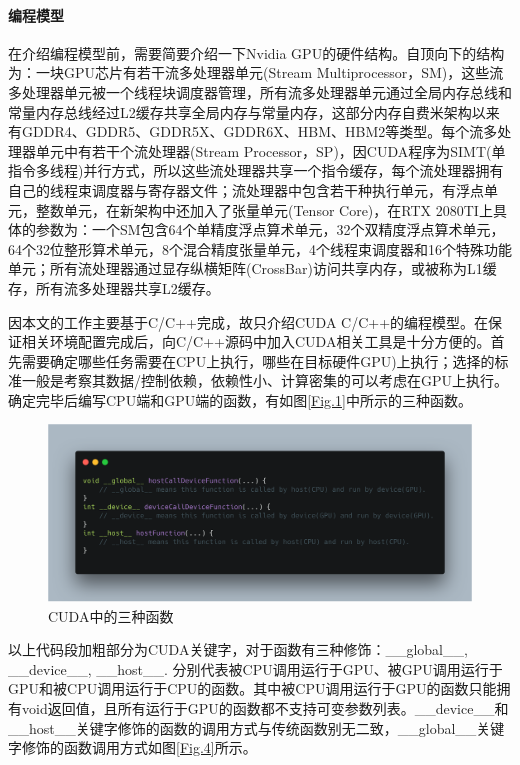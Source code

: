 \paragraph{编程模型}
\par 在介绍编程模型前，需要简要介绍一下Nvidia GPU的硬件结构。自顶向下的结构为：一块GPU芯片有若干流多处理器单元(Stream Multiprocessor，SM)，这些流多处理器单元被一个线程块调度器管理，所有流多处理器单元通过全局内存总线和常量内存总线经过L2缓存共享全局内存与常量内存，这部分内存自费米架构以来有GDDR4、GDDR5、GDDR5X、GDDR6X、HBM、HBM2等类型。每个流多处理器单元中有若干个流处理器(Stream Processor，SP)，因CUDA程序为SIMT(单指令多线程)并行方式，所以这些流处理器共享一个指令缓存，每个流处理器拥有自己的线程束调度器与寄存器文件；流处理器中包含若干种执行单元，有浮点单元，整数单元，在新架构中还加入了张量单元(Tensor Core)，在RTX 2080TI上具体的参数为：一个SM包含64个单精度浮点算术单元，32个双精度浮点算术单元，64个32位整形算术单元，8个混合精度张量单元，4个线程束调度器和16个特殊功能单元；所有流处理器通过显存纵横矩阵(CrossBar)访问共享内存，或被称为L1缓存\parencite{EXPLORING}，所有流多处理器共享L2缓存。
\par 因本文的工作主要基于C/C++完成，故只介绍CUDA C/C++的编程模型。在保证相关环境配置完成后，向C/C++源码中加入CUDA相关工具是十分方便的。首先需要确定哪些任务需要在CPU上执行，哪些在目标硬件GPU)上执行；选择的标准一般是考察其数据/控制依赖，依赖性小、计算密集的可以考虑在GPU上执行。确定完毕后编写CPU端和GPU端的函数，有如图\ref{Fig.1}中所示的三种函数。
\begin{figure}
	\centering
	\includegraphics[width=15cm]{figures/CODE1.png}
	\caption{\label{Fig.2} CUDA中的三种函数}
\end{figure}
\par 以上代码段加粗部分为CUDA关键字，对于函数有三种修饰：\_\_global\_\_, \_\_device\_\_, \_\_host\_\_. 分别代表被CPU调用运行于GPU、被GPU调用运行于GPU和被CPU调用运行于CPU的函数。其中被CPU调用运行于GPU的函数只能拥有void返回值，且所有运行于GPU的函数都不支持可变参数列表\parencite{EVENEASIER}。\_\_device\_\_和\_\_host\_\_关键字修饰的函数的调用方式与传统函数别无二致，\_\_global\_\_关键字修饰的函数调用方式如图\ref{Fig.4}所示。
